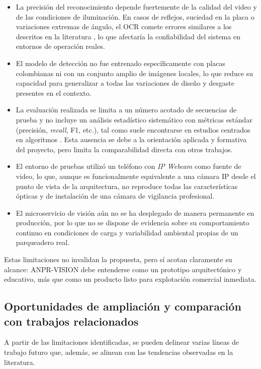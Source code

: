 \begin{itemize}
    \item La precisión del reconocimiento depende fuertemente de la calidad del video y de las condiciones de iluminación. En casos de reflejos, suciedad en la placa o variaciones extremas de ángulo, el OCR comete errores similares a los descritos en la literatura \cite{lpr_ai_dl_2025}, lo que afectaría la confiabilidad del sistema en entornos de operación reales.
    \item El modelo de detección no fue entrenado específicamente con placas colombianas ni con un conjunto amplio de imágenes locales, lo que reduce su capacidad para generalizar a todas las variaciones de diseño y desgaste presentes en el contexto.
    \item La evaluación realizada se limita a un número acotado de secuencias de prueba y no incluye un análisis estadístico sistemático con métricas estándar (precisión, \textit{recall}, F1, etc.), tal como suele encontrarse en estudios centrados en algoritmos \cite{anpr_pakistan_2020}. Esta ausencia se debe a la orientación aplicada y formativa del proyecto, pero limita la comparabilidad directa con otros trabajos.
    \item El entorno de pruebas utilizó un teléfono con \textit{IP Webcam} como fuente de video, lo que, aunque es funcionalmente equivalente a una cámara IP desde el punto de vista de la arquitectura, no reproduce todas las características ópticas y de instalación de una cámara de vigilancia profesional.
    \item El microservicio de visión aún no se ha desplegado de manera permanente en producción, por lo que no se dispone de evidencia sobre su comportamiento continuo en condiciones de carga y variabilidad ambiental propias de un parqueadero real.
\end{itemize}

Estas limitaciones no invalidan la propuesta, pero sí acotan claramente su alcance: ANPR-VISION debe entenderse como un prototipo arquitectónico y educativo, más que como un producto listo para explotación comercial inmediata.

\subsection{Oportunidades de ampliación y comparación con trabajos relacionados}

A partir de las limitaciones identificadas, se pueden delinear varias líneas de trabajo futuro que, además, se alinean con las tendencias observadas en la literatura.

